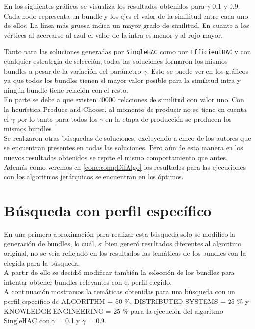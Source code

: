En los siguientes gráficos se visualiza los resultados obtenidos para $\gamma$ 0.1 y 0.9. Cada 
nodo representa un bundle y los ejes el valor de la similitud entre cada uno de ellos. La línea más 
gruesa indica un mayor grado de similitud. En cuanto a los vértices al acercarse al azul el valor 
de la intra es menor y al rojo mayor.


Tanto para las soluciones generadas por \texttt{SingleHAC} como por \texttt{EfficientHAC} y con 
cualquier estrategia de selección, todas las soluciones formaron los mismos bundles a pesar de la 
variación del parámetro $\gamma$. Esto se puede ver en los gráficos ya que todos los bundles 
tienen el mayor valor posible para la similitud intra y ningún bundle tiene relación con el 
resto.\\
En parte se debe a que existen $40000$ relaciones de similitud con valor uno. Con la 
heurística Produce and Choose, al momento de producir no se tiene en cuenta el $\gamma$ por lo tanto 
para todos los $\gamma$ en la etapa de producción se producen los mismos bundles.\\
Se realizaron otras búsquedas de soluciones, excluyendo a cinco de los autores que se encuentran 
presentes en todas las soluciones. Pero aún de esta manera en los nuevos resultados obtenidos se 
repite el mismo comportamiento que antes.\\
Además como veremos en \ref{conc:compDifAlgo} los resultados para las ejecuciones con los 
algoritmos jerárquicos se encuentran en los óptimos.

\section{Búsqueda con perfil específico}
En una primera aproximación para realizar esta búsqueda solo se modifico la generación de bundles, 
lo cuál, si bien generó resultados diferentes al algoritmo original, no se veía reflejado en los 
resultados las temáticas de los bundles con la elegida para la búsqueda.\\
A partir de ello se decidió modificar también la selección de los bundles para intentar obtener 
bundles relevantes con el perfil elegido.\\
A continuación mostramos la temáticas obtenidas para una búsqueda con un perfil específico de 
ALGORITHM = 50 \%, DISTRIBUTED SYSTEMS = 25 \% y KNOWLEDGE ENGINEERING = 25 \% para la ejecución 
del algoritmo SingleHAC con $\gamma$ = 0.1 y $\gamma$ = 0.9.